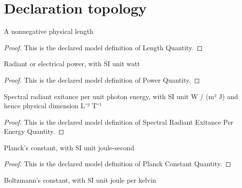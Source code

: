 \section{Declaration topology}
\begin{definition}
  \label{def:physics:phyx-mini-0614:phyxminiproblems-problemphyxmini0614-lengthquantity}
  A nonnegative physical length
\end{definition}
\begin{proof}
  This is the declared model definition of Length Quantity.
\end{proof}
\begin{definition}
  \label{def:physics:phyx-mini-0614:phyxminiproblems-problemphyxmini0614-powerquantity}
  Radiant or electrical power, with SI unit watt
\end{definition}
\begin{proof}
  This is the declared model definition of Power Quantity.
\end{proof}
\begin{definition}
  \label{def:physics:phyx-mini-0614:phyxminiproblems-problemphyxmini0614-spectralradiantexitanceperenergyquantity}
  Spectral radiant exitance per unit photon energy, with SI unit W / (m² J) and hence physical dimension L⁻² T⁻¹
\end{definition}
\begin{proof}
  This is the declared model definition of Spectral Radiant Exitance Per Energy Quantity.
\end{proof}
\begin{definition}
  \label{def:physics:phyx-mini-0614:phyxminiproblems-problemphyxmini0614-planckconstantquantity}
  Planck's constant, with SI unit joule-second
\end{definition}
\begin{proof}
  This is the declared model definition of Planck Constant Quantity.
\end{proof}
\begin{definition}
  \label{def:physics:phyx-mini-0614:phyxminiproblems-problemphyxmini0614-boltzmannconstantquantity}
  Boltzmann's constant, with SI unit joule per kelvin
\end{definition}

